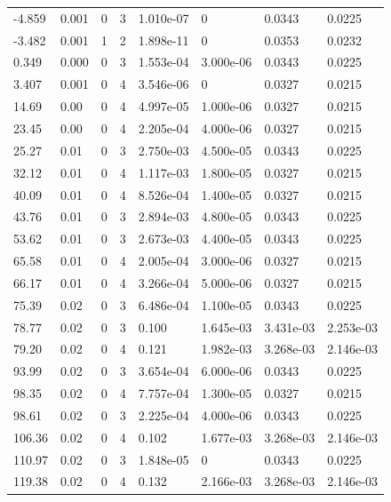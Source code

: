 \documentclass[preview]{standalone}
\begin{document}
{{\begin{tabular}{L{1.2cm}C{1.2cm} C{0.3cm}C{0.5cm} C{1.4cm}C{1.4cm} C{1.4cm}C{1.4cm}}
  -4.859  &  0.001  & 0     &  3 &  1.010e-07  & 0  & 0.0343 &  0.0225   \\ 
  -3.482  &  0.001  & 1     &  2 &  1.898e-11  & 0  & 0.0353 &  0.0232   \\ 
  0.349  &  0.000  & 0     &  3 &  1.553e-04  & 3.000e-06  & 0.0343 &  0.0225   \\ 
  3.407  &  0.001  & 0     &  4 &  3.546e-06  & 0  & 0.0327 &  0.0215   \\ 
  14.69  &  0.00  & 0     &  4 &  4.997e-05  & 1.000e-06  & 0.0327 &  0.0215   \\ 
  23.45  &  0.00  & 0     &  4 &  2.205e-04  & 4.000e-06  & 0.0327 &  0.0215   \\ 
  25.27  &  0.01  & 0     &  3 &  2.750e-03  & 4.500e-05  & 0.0343 &  0.0225   \\ 
  32.12  &  0.01  & 0     &  4 &  1.117e-03  & 1.800e-05  & 0.0327 &  0.0215   \\ 
  40.09  &  0.01  & 0     &  4 &  8.526e-04  & 1.400e-05  & 0.0327 &  0.0215   \\ 
  43.76  &  0.01  & 0     &  3 &  2.894e-03  & 4.800e-05  & 0.0343 &  0.0225   \\ 
  53.62  &  0.01  & 0     &  3 &  2.673e-03  & 4.400e-05  & 0.0343 &  0.0225   \\ 
  65.58  &  0.01  & 0     &  4 &  2.005e-04  & 3.000e-06  & 0.0327 &  0.0215   \\ 
  66.17  &  0.01  & 0     &  4 &  3.266e-04  & 5.000e-06  & 0.0327 &  0.0215   \\ 
  75.39  &  0.02  & 0     &  3 &  6.486e-04  & 1.100e-05  & 0.0343 &  0.0225   \\ 
  78.77  &  0.02  & 0     &  3 &  0.100  & 1.645e-03  & 3.431e-03 &  2.253e-03   \\ 
  79.20  &  0.02  & 0     &  4 &  0.121  & 1.982e-03  & 3.268e-03 &  2.146e-03   \\ 
  93.99  &  0.02  & 0     &  3 &  3.654e-04  & 6.000e-06  & 0.0343 &  0.0225   \\ 
  98.35  &  0.02  & 0     &  4 &  7.757e-04  & 1.300e-05  & 0.0327 &  0.0215   \\ 
  98.61  &  0.02  & 0     &  3 &  2.225e-04  & 4.000e-06  & 0.0343 &  0.0225   \\ 
  106.36  &  0.02  & 0     &  4 &  0.102  & 1.677e-03  & 3.268e-03 &  2.146e-03   \\ 
  110.97  &  0.02  & 0     &  3 &  1.848e-05  & 0  & 0.0343 &  0.0225   \\ 
  119.38  &  0.02  & 0     &  4 &  0.132  & 2.166e-03  & 3.268e-03 &  2.146e-03   \\ 

\end{tabular}}}
\end{document}
